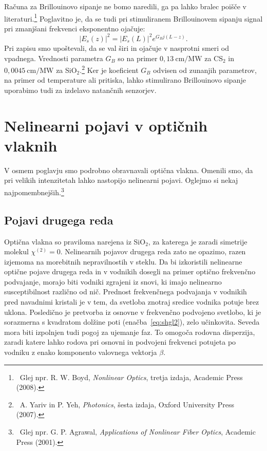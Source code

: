 Računa za Brillouinovo sipanje ne bomo naredili, ga pa lahko bralec poišče
v literaturi.\footnote{~Glej npr. R. W. Boyd, {\it Nonlinear Optics}, tretja izdaja, Academic Press (2008).}
Poglavitno 
je, da se tudi pri stimuliranem Brillouinovem sipanju signal pri zmanjšani frekvenci
eksponentno ojačuje:
\begin{equation}
|E_s(z)|^2 = |E_s(L)|^2 e^{G_Bj(L-z)}.
\end{equation}
Pri zapisu smo upoštevali, da se val širi in ojačuje v nasprotni smeri od vpadnega.
Vrednosti parametra $G_B$ so na primer $0,13~\si{\cm/\mega\watt}$ za CS$_2$ 
in $0,0045~\si{\cm/\mega\watt}$ za SiO$_2$.\footnote{~A. Yariv in 
P. Yeh, {\it Photonics}, šesta izdaja, Oxford University Press (2007).}
Ker je koeficient $G_B$ odvisen od zunanjih parametrov, na primer od 
temperature ali pritiska, lahko stimulirano Brillouinovo sipanje uporabimo tudi za
izdelavo natančnih senzorjev. 

\section{Nelinearni pojavi v optičnih vlaknih}
\label{NLOFIB}
V osmem poglavju smo podrobno obravnavali optična vlakna. Omenili smo, da pri 
velikih intenzitetah lahko nastopijo nelinearni pojavi. Oglejmo si nekaj najpomembnejših.\footnote{~Glej npr.
G. P. Agrawal, {\it Applications of Nonlinear Fiber Optics}, Academic Press (2001).}

\subsection*{Pojavi drugega reda}
Optična vlakna so praviloma narejena iz SiO$_2$, 
za katerega je zaradi simetrije molekul $\chi^{(2)}=0$. 
Nelinearnih pojavov drugega reda zato ne opazimo, razen izjemoma na morebitnih 
nepravilnostih v steklu.
Da bi izkoristili nelinearne optične pojave
drugega reda in v vodnikih dosegli na primer optično frekvenčno podvajanje,
morajo biti vodniki zgrajeni iz snovi, ki imajo nelinearno susceptibilnost 
različno od nič. Prednost frekvenčnega podvajanja v vodnikih pred navadnimi 
kristali je v tem, 
da svetloba znotraj sredice vodnika potuje brez uklona. Posledično je
pretvorba iz osnovne v frekvenčno podvojeno svetlobo, ki je sorazmerna s kvadratom 
dolžine poti (enačba~\ref{eq:shgl2}), zelo učinkovita. Seveda 
mora biti izpolnjen tudi pogoj za ujemanje faz. To 
omogoča rodovna disperzija, zaradi 
katere lahko rodova pri osnovni in podvojeni frekvenci potujeta po vodniku
z enako komponento valovnega vektorja $\beta$.

